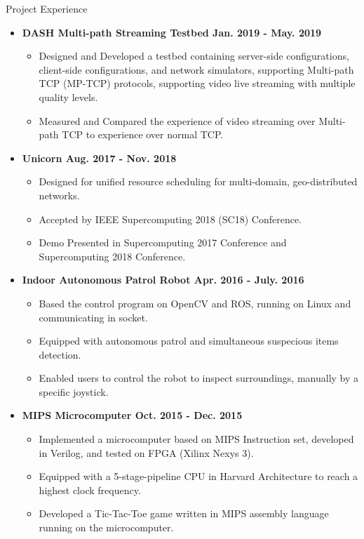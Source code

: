 \documentclass[10pt,oneside]{article}
\newenvironment{ressection}[1]{
	\vspace{4pt}
	{\fontfamily{phv}\selectfont\Large#1}
	\begin{itemize}
	\vspace{3pt}
}{
	\end{itemize}
}
\newcommand{\resitem}[1]{
	\vspace{-4pt}
	\item \begin{flushleft} #1 \end{flushleft}
}
\newcommand{\ressubitem}[1]{
	\vspace{-1pt}
	\item \begin{flushleft} #1 \end{flushleft}
}
\newenvironment{reslist}[1]{
	\resitem{\textbf{#1}}
	\vspace{-5pt}
	\begin{itemize}
}{
	\end{itemize}
}
\begin{document}
\pagebreak

\begin{ressection}{Project Experience}
	\begin{reslist}{DASH Multi-path Streaming Testbed \hfill Jan. 2019 - May. 2019}
		\ressubitem{Designed and Developed a testbed containing server-side configurations,
			client-side configurations, and network simulators, supporting Multi-path
			TCP (MP-TCP) protocols, supporting video live streaming with multiple
			quality levels.}
		\ressubitem{Measured and Compared the experience of video streaming over
			Multi-path TCP to experience over normal TCP.}
	\end{reslist}
	\begin{reslist}{Unicorn \hfill Aug. 2017 - Nov. 2018}
		\ressubitem{Designed for unified resource scheduling for multi-domain, geo-distributed networks.}
		\ressubitem{Accepted by IEEE Supercomputing 2018 (SC18) Conference.}
		\ressubitem{Demo Presented in Supercomputing 2017 Conference and Supercomputing 2018 Conference.}
	\end{reslist}
	\begin{reslist}{Indoor Autonomous Patrol Robot \hfill Apr. 2016 - July. 2016}
		\ressubitem{Based the control program on OpenCV and ROS, running on Linux and communicating in socket.}
		\ressubitem{Equipped with autonomous patrol and simultaneous suspecious items detection.}
		\ressubitem{Enabled users to control the robot to inspect surroundings, manually by a specific joystick.}
	\end{reslist}
	\begin{reslist}{MIPS Microcomputer \hfill Oct. 2015 - Dec. 2015}
		\ressubitem{Implemented a microcomputer based on MIPS Instruction set,
			developed in Verilog, and tested on FPGA (Xilinx Nexys 3). }
		\ressubitem{Equipped with a 5-stage-pipeline CPU in Harvard Architecture to reach a highest clock frequency.}
		\ressubitem{Developed a Tic-Tac-Toe game written in MIPS assembly language running on the microcomputer.}
	\end{reslist}
\end{ressection}
\end{document}
